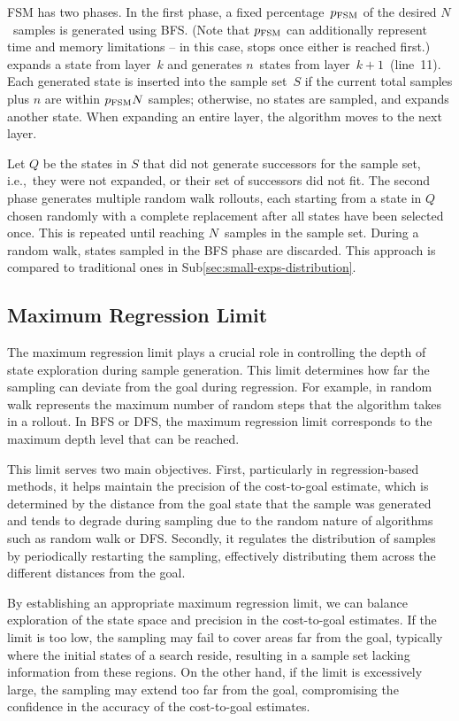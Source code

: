 FSM has two phases. In the first phase, a fixed percentage~$p_\text{FSM}$ of the desired $N$~samples is generated using BFS. (Note that $p_\text{FSM}$ can additionally represent time and memory limitations -- in this case, \bfs stops once either is reached first.) \bfs expands a state from layer~$k$ and generates $n$~states from layer~$k+1$~(line~11). Each generated state is inserted into the sample set~$S$ if the current total samples plus $n$ are within $p_{\text{FSM}}N$ samples; otherwise, no states are sampled, and \bfs expands another state. When expanding an entire layer, the algorithm moves to the next layer.

Let $Q$ be the states in $S$ that did not generate successors for the sample set, i.e.,~they were not expanded, or their set of successors did not fit. The second phase generates multiple random walk rollouts, each starting from a state in $Q$ chosen randomly with a complete replacement after all states have been selected once. This is repeated until reaching $N$~samples in the sample set. During a random walk, states sampled in the BFS phase are discarded. This approach is compared to traditional ones in Sub\cref{sec:small-exps-distribution}.

\subsection{Maximum Regression Limit}
\label{sec:rollout-limit}

The maximum regression limit plays a crucial role in controlling the depth of state exploration during sample generation. This limit determines how far the sampling can deviate from the goal during regression. For example, in random walk represents the maximum number of random steps that the algorithm takes in a rollout. In BFS or DFS, the maximum regression limit corresponds to the maximum depth level that can be reached.

This limit serves two main objectives. First, particularly in regression-based methods, it helps maintain the precision of the cost-to-goal estimate, which is determined by the distance from the goal state that the sample was generated and tends to degrade during sampling due to the random nature of algorithms such as random walk or DFS. Secondly, it regulates the distribution of samples by periodically restarting the sampling, effectively distributing them across the different distances from the goal.

By establishing an appropriate maximum regression limit, we can balance exploration of the state space and precision in the cost-to-goal estimates. If the limit is too low, the sampling may fail to cover areas far from the goal, typically where the initial states of a search reside, resulting in a sample set lacking information from these regions. On the other hand, if the limit is excessively large, the sampling may extend too far from the goal, compromising the confidence in the accuracy of the cost-to-goal estimates.

